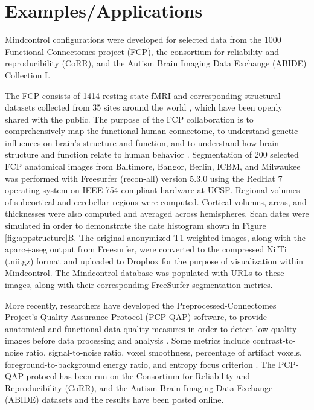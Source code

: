\section{Examples/Applications}

Mindcontrol configurations were developed for selected data from the 1000 Functional Connectomes project (FCP), the consortium for reliability and reproducibility (CoRR), and the Autism Brain Imaging Data Exchange (ABIDE) Collection I. 

The FCP consists of 1414 resting state fMRI and corresponding structural datasets collected from 35 sites around the world  \cite{biswal2010toward}, which have been openly shared with the public. The purpose of the FCP collaboration is to comprehensively map the functional human connectome, to understand genetic influences on brain's structure and function, and to understand how brain structure and function relate to human behavior \cite{biswal2010toward}. Segmentation of 200 selected FCP anatomical images from Baltimore, Bangor, Berlin, ICBM, and Milwaukee was performed with Freesurfer (recon-all) version 5.3.0 \cite{fischl2002whole} using the RedHat 7 operating system on IEEE 754 compliant hardware at UCSF. Regional volumes of  subcortical and cerebellar regions were computed. Cortical volumes, areas, and thicknesses were also computed and averaged across hemispheres. Scan dates were simulated in order to demonstrate the date histogram shown in Figure \ref{fig:appstructure}B. The original anonymized T1-weighted images, along with the aparc+aseg output from Freesurfer, were converted to the compressed NifTi (.nii.gz) format and uploaded to Dropbox for the purpose of visualization within Mindcontrol. The Mindcontrol database was populated with URLs to these images, along with their corresponding FreeSurfer segmentation metrics.

More recently, researchers have developed the Preprocessed-Connectomes Project's Quality Assurance Protocol (PCP-QAP) software, to provide anatomical and functional data quality measures in order to detect low-quality images before data processing and analysis \cite{shehzadpreprocessed}. Some metrics include contrast-to-noise ratio, signal-to-noise ratio, voxel smoothness, percentage of artifact voxels, foreground-to-background energy ratio, and entropy focus criterion \cite{shehzadpreprocessed}. The PCP-QAP protocol has been run on the  Consortium for Reliability and Reproducibility (CoRR), and the Autism Brain Imaging Data Exchange (ABIDE) datasets and the results have been posted online. 

